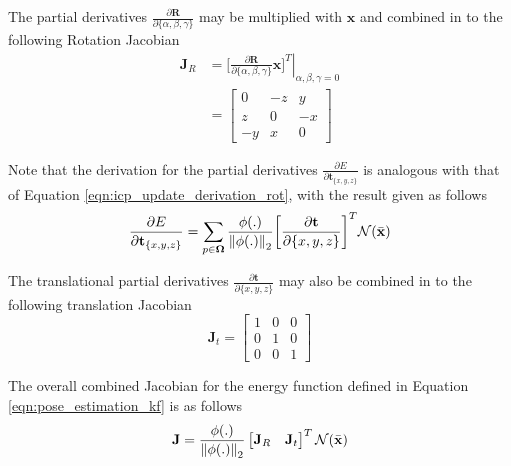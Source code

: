 The partial derivatives
$\frac{\partial \mathbf{R}}{\partial \{\alpha, \beta, \gamma\}}$ may be
multiplied with $\mathbf{x}$ and combined in to the following Rotation Jacobian
\begin{align}
  \label{eqn:rot_jac}
  \mathbf{J}_{R} & = \left. \bigg[
    \frac{\partial \mathbf{R}}{\partial \{\alpha, \beta, \gamma\}} \mathbf{x}
    \bigg]^{T} \right\vert_{\alpha,\beta,\gamma = 0} \\
  & =
  \begin{bmatrix}
    0 & -z & y \\
    z & 0 & -x \\
    -y & x & 0
  \end{bmatrix}
\end{align}

Note that the derivation for the partial derivatives
$\frac{\partial E}{\partial \mathbf{t}_{\{x, y, z\}}}$ is analogous with that of
Equation \ref{eqn:icp_update_derivation_rot}, with the result given as follows
\begin{equation}
  \label{eqn:icp_update_derivation_trans}
  \frac{\partial E}{\partial \mathbf{t}_{\{x, y, z\}}} =
  \sum_{p \in \mathbf{\Omega}}
  \frac{\phi(.)}{\left\lVert\phi(.)\right\rVert_{2}}
  \bigg[ \frac{\partial \mathbf{t}}{\partial \{x, y, z\}}\bigg]^{T}
  \mathcal{N}(\bar{\mathbf{x}})
\end{equation}

The translational partial derivatives
$\frac{\partial \mathbf{t}}{\partial \{x, y, z\}}$ may also be combined in to
the following translation Jacobian
\begin{equation}
  \label{eqn:trans_jac}
  \mathbf{J}_{t} =
  \begin{bmatrix}
    1 & 0 & 0 \\
    0 & 1 & 0 \\
    0 & 0 & 1
  \end{bmatrix}
\end{equation}

The overall combined Jacobian for the energy function defined in Equation
\ref{eqn:pose_estimation_kf} is as follows
\begin{equation}
  \label{eqn:pose_jacobian}
  \mathbf{J} =
  \frac{\phi(.)}{\left\lVert\phi(.)\right\rVert_{2}}
  \begin{bmatrix}
    \mathbf{J}_{R} & \mathbf{J}_{t}
  \end{bmatrix}^{T}
  \mathcal{N}(\bar{\mathbf{x}})
\end{equation}

